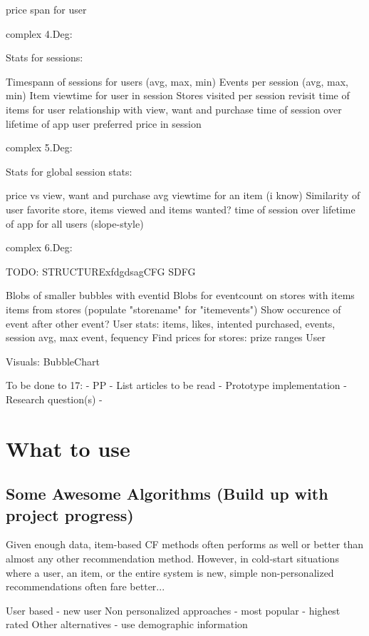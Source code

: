         price span for user

    complex 4.Deg:

        Stats for sessions:

            Timespann of sessions for users (avg, max, min)
            Events per session (avg, max, min)
            Item viewtime for user in session
            Stores visited per session
            revisit time of items for user
            relationship with view, want and purchase
            time of session over lifetime of app
            user preferred price in session

    complex 5.Deg:

        Stats for global session stats:

            price vs view, want and purchase
            avg viewtime for an item (i know)
            Similarity of user favorite store, items viewed and items wanted?
            time of session over lifetime of app for all users (slope-style)

    complex 6.Deg:

TODO: STRUCTURExfdgdsagCFG
SDFG

    Blobs of smaller bubbles with eventid
    Blobs for eventcount on stores with items items from stores (populate "storename" for "itemevents")
    Show occurence of event after other event?
    User stats: items, likes, intented purchased, events, session avg, max event, fequency
    Find prices for stores: prize ranges
    User

Visuals:
    BubbleChart

To be done to 17:
    - PP
    - List articles to be read
    - Prototype implementation
    - Research question(s)
    -


\section{What to use}


%
\subsection{Some Awesome Algorithms (Build up with project progress)}

Given enough data, item-based CF methods often performs as well or better than
almost any other recommendation method. However, in cold-start situations where
a user, an item, or the entire system is new, simple non-personalized
recommendations often fare better...

User based - new user
Non personalized approaches
	- most popular
	- highest rated
Other alternatives
	- use demographic information

